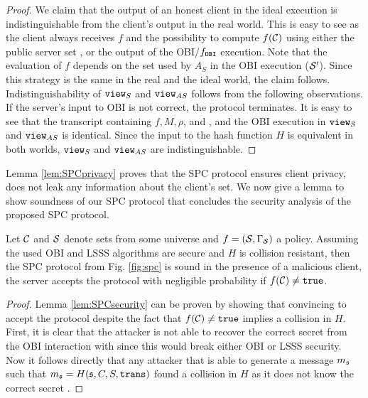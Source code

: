 \begin{proof}
We claim that the output of an honest client in the ideal execution is indistinguishable from the client's output in the real world.
This is easy to see as the client always receives $f$ and the possibility to compute $f(\mathcal{C})$ using either the public server set \cS, or the output of the \ac{OBI}/$f_\mathtt{OBI}$ execution.
Note that the evaluation of $f$ depends on the set used by $A_S$ in the \ac{OBI} execution ($\mathcal{S}'$).
Since this strategy is the same in the real and the ideal world, the claim follows.
Indistinguishability of $\mathtt{view}_S$ and $\mathtt{view}_{AS}$ follows from the following observations.
If the server's input to \ac{OBI} is not correct, the protocol terminates.
It is easy to see that the transcript containing $f, M, \rho$, and \cS, and the \ac{OBI} execution in $\mathtt{view}_S$ and $\mathtt{view}_{AS}$ is identical.
Since the input to the hash function $H$ is equivalent in both worlds, $\mathtt{view}_S$ and $\mathtt{view}_{AS}$ are indistinguishable.

\end{proof}

\noindent
Lemma \ref{lem:SPCprivacy} proves that the \ac{SPC} protocol ensures client privacy, \ie does not leak any information about the client's set.
We now give a lemma to show soundness of our \ac{SPC} protocol that concludes the security analysis of the proposed \ac{SPC} protocol.

\begin{lemma}[Soundness]\label{lem:SPCsecurity}
  Let $\mathcal{C}$ and $\mathcal{S}$ denote sets from some universe and $f=(\mathcal{S},\Gamma_\mathcal{S})$ a policy.
  Assuming the used \ac{OBI} and \ac{LSSS} algorithms are secure and $H$ is collision resistant, then the \ac{SPC} protocol from Fig. \ref{fig:spc} is sound in the presence of a malicious client, \ie the server accepts the protocol with negligible probability if $f(\mathcal{C})\not=\mathtt{true}$.
\end{lemma}

\begin{proof}
Lemma \ref{lem:SPCsecurity} can be proven by showing that convincing \Server to accept the protocol despite the fact that $f(\mathcal{C})\not=\mathtt{true}$ implies a collision in $H$.
First, it is clear that the attacker is not able to recover the correct secret \secret from the \ac{OBI} interaction with \Server since this would break either \ac{OBI} or \ac{LSSS} security.
Now it follows directly that any attacker that is able to generate a message $m_\mathfrak{s}$ such that $m_\mathfrak{s}=H(\mathfrak{s},C,S,\mathtt{trans})$ found a collision in $H$ as it does not know the correct secret \secret.
\end{proof}


